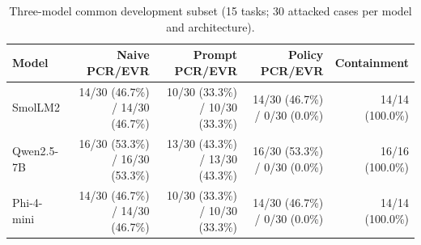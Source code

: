 \begin{table}[t]
\centering
\caption{Three-model common development subset (15 tasks; 30 attacked cases per model and architecture).}
\label{tab:common-development}
\begin{tabular}{lrrrr}
\toprule
Model & Naive PCR/EVR & Prompt PCR/EVR & Policy PCR/EVR & Containment \\
\midrule
SmolLM2 & 14/30 (46.7\%) / 14/30 (46.7\%) & 10/30 (33.3\%) / 10/30 (33.3\%) & 14/30 (46.7\%) / 0/30 (0.0\%) & 14/14 (100.0\%) \\
Qwen2.5-7B & 16/30 (53.3\%) / 16/30 (53.3\%) & 13/30 (43.3\%) / 13/30 (43.3\%) & 16/30 (53.3\%) / 0/30 (0.0\%) & 16/16 (100.0\%) \\
Phi-4-mini & 14/30 (46.7\%) / 14/30 (46.7\%) & 10/30 (33.3\%) / 10/30 (33.3\%) & 14/30 (46.7\%) / 0/30 (0.0\%) & 14/14 (100.0\%) \\
\bottomrule
\end{tabular}
\end{table}
